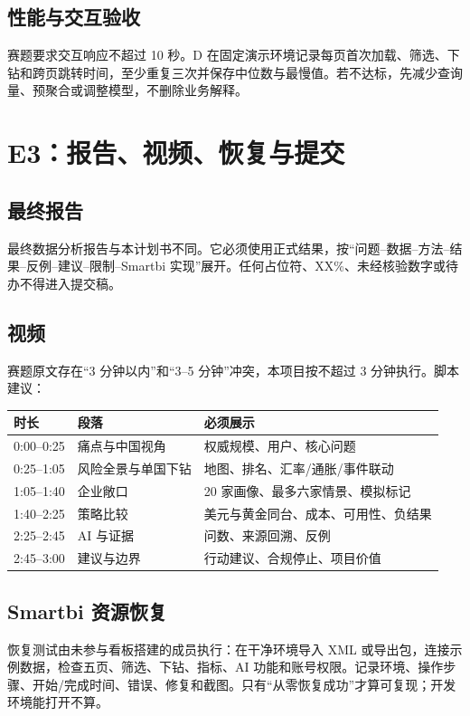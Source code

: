 \documentclass[UTF8,12pt,openany]{ctexbook}
\begin{document}
\section{性能与交互验收}
赛题要求交互响应不超过 10 秒\autocite[7--8]{competition2026}。D 在固定演示环境记录每页首次加载、筛选、下钻和跨页跳转时间，至少重复三次并保存中位数与最慢值。若不达标，先减少查询量、预聚合或调整模型，不删除业务解释。

\chapter{E3：报告、视频、恢复与提交}

\section{最终报告}
最终数据分析报告与本计划书不同。它必须使用正式结果，按“问题--数据--方法--结果--反例--建议--限制--Smartbi 实现”展开。任何占位符、XX\%、未经核验数字或待办不得进入提交稿。

\section{视频}
赛题原文存在“3 分钟以内”和“3--5 分钟”冲突，本项目按不超过 3 分钟执行\autocite[5--8]{competition2026}。脚本建议：

\begin{longtable}{p{2.2cm}p{4.5cm}p{7.0cm}}
\toprule
\textbf{时长} & \textbf{段落} & \textbf{必须展示}\\
\midrule
0:00--0:25 & 痛点与中国视角 & 权威规模、用户、核心问题\\
0:25--1:05 & 风险全景与单国下钻 & 地图、排名、汇率/通胀/事件联动\\
1:05--1:40 & 企业敞口 & 20 家画像、最多六家情景、模拟标记\\
1:40--2:25 & 策略比较 & 美元与黄金同台、成本、可用性、负结果\\
2:25--2:45 & AI 与证据 & 问数、来源回溯、反例\\
2:45--3:00 & 建议与边界 & 行动建议、合规停止、项目价值\\
\bottomrule
\end{longtable}

\section{Smartbi 资源恢复}
恢复测试由未参与看板搭建的成员执行：在干净环境导入 XML 或导出包，连接示例数据，检查五页、筛选、下钻、指标、AI 功能和账号权限。记录环境、操作步骤、开始/完成时间、错误、修复和截图。只有“从零恢复成功”才算可复现；开发环境能打开不算。
\end{document}
